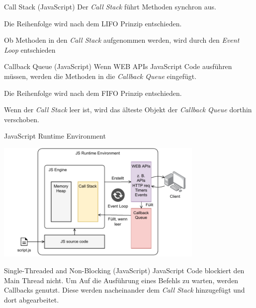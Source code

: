\begin{defi}{Call Stack (JavaScript)}
    Der \emph{Call Stack} führt Methoden synchron aus.

    Die Reihenfolge wird nach dem LIFO Prinzip entschieden.

    Ob Methoden in den \emph{Call Stack} aufgenommen werden, wird durch den \emph{Event Loop} entschieden
\end{defi}

\begin{defi}{Callback Queue (JavaScript)}
    Wenn WEB APIs JavaScript Code ausführen müssen, werden die Methoden in die \emph{Callback Queue} eingefügt.

    Die Reihenfolge wird nach dem FIFO Prinzip entschieden.

    Wenn der \emph{Call Stack} leer ist, wird das älteste Objekt der \emph{Callback Queue} dorthin verschoben.
\end{defi}

\begin{defi}{JavaScript Runtime Environment}
    \begin{center}
        \includegraphics[width=0.75\textwidth]{includes/figures/defi_js_runtime_environment.pdf}
    \end{center}
\end{defi}

\begin{bonus}{Single-Threaded and Non-Blocking (JavaScript)}
    JavaScript Code blockiert den Main Thread nicht.
    Um Auf die Ausführung eines Befehls zu warten, werden Callbacks genutzt.
    Diese werden nacheinander dem \emph{Call Stack} hinzugefügt und dort abgearbeitet.
\end{bonus}

